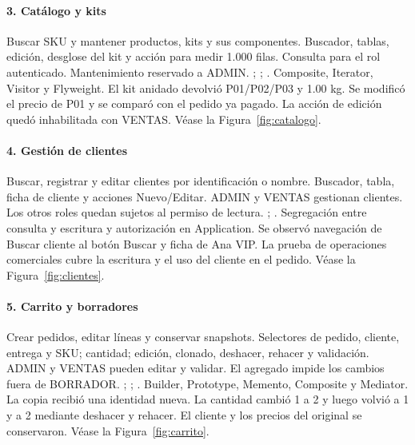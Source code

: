 \clearpage
\paragraph{3. Catálogo y kits}
 Buscar SKU y mantener productos, kits y sus componentes.
 Buscador, tablas, edición, desglose del kit y acción para medir 1.000 filas.
 Consulta para el rol autenticado. Mantenimiento reservado a ADMIN.
 ; ; .
 Composite, Iterator, Visitor y Flyweight.
 El kit anidado devolvió P01/P02/P03 y 1.00 kg. Se modificó el precio de P01 y se comparó con el pedido ya pagado. La acción de edición quedó inhabilitada con VENTAS. Véase la Figura~\ref{fig:catalogo}.

\clearpage
\paragraph{4. Gestión de clientes}
 Buscar, registrar y editar clientes por identificación o nombre.
 Buscador, tabla, ficha de cliente y acciones Nuevo/Editar.
 ADMIN y VENTAS gestionan clientes. Los otros roles quedan sujetos al permiso de lectura.
 ; .
 Segregación entre consulta y escritura y autorización en Application.
 Se observó navegación de Buscar cliente al botón Buscar y ficha de Ana VIP. La prueba de operaciones comerciales cubre la escritura y el uso del cliente en el pedido. Véase la Figura~\ref{fig:clientes}.

\clearpage
\paragraph{5. Carrito y borradores}
 Crear pedidos, editar líneas y conservar snapshots.
 Selectores de pedido, cliente, entrega y SKU; cantidad; edición, clonado, deshacer, rehacer y validación.
 ADMIN y VENTAS pueden editar y validar. El agregado impide los cambios fuera de BORRADOR.
 ; ; .
 Builder, Prototype, Memento, Composite y Mediator.
 La copia recibió una identidad nueva. La cantidad cambió 1 a 2 y luego volvió a 1 y a 2 mediante deshacer y rehacer. El cliente y los precios del original se conservaron. Véase la Figura~\ref{fig:carrito}.

